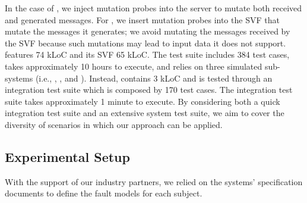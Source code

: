 In the case of \PARAM, we inject mutation probes into the \PARAM server to mutate both received and generated messages. For \ESAIL, we insert mutation probes into the SVF that mutate the messages it generates; we avoid mutating the messages received by the SVF because such mutations may lead to input data it does not support. 
\ESAIL features 74 kLoC and its SVF 65 kLoC. 
The \ESAIL test suite includes 384 test cases, takes approximately 10 hours to execute, and relies on three simulated
\SVF sub-systems (i.e., \ADCS, \GPS, and \PDHU).
Instead, \PARAM contains 3 kLoC and is tested through an integration test suite which is composed by 170 test cases. 
The \PARAM integration test suite takes approximately 1 minute to execute.
By considering both a quick integration test suite and an extensive system test suite, we aim to cover the diversity of scenarios in which our approach can be applied.




\subsection{Experimental Setup}


With the support of our industry partners, we relied on  
 the systems' specification documents 
 to define the fault models for each subject.
 







